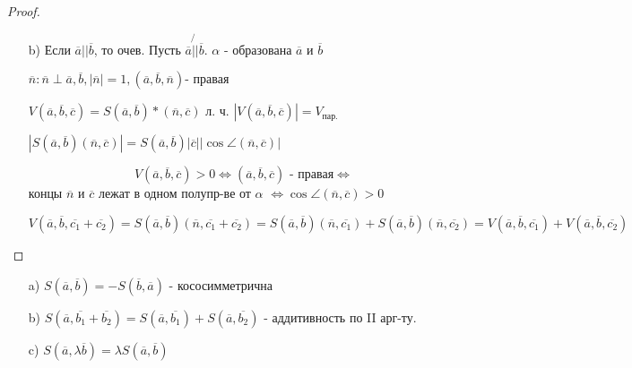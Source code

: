 \begin{proof}
\begin{itemize}
  \item [b) ] Если $\overline{a} || \overline{b}$, то очев.
    Пусть $\overline{a} \not{||} \overline{b}$. $\alpha$ - образована $\overline{a}$ и $\overline{b}$

    $\overline{n}\colon \overline{n} \perp \overline{a}, \overline{b}, |\overline{n}| = 1, (\overline{a}, \overline{b}, \overline{n}) \text{- правая}$

    \begin{lemma}
    $V(\overline{a}, \overline{b}, \overline{c}) = S(\overline{a}, \overline{b}) * (\overline{n}, \overline{c})$
    л. ч. $|V(\overline{a}, \overline{b}, \overline{c})| = V_{\text{пар.}}$

    $|S(\overline{a}, \overline{b}) (\overline{n}, \overline{c})| = S(\overline{a}, \overline{b}) |\overline{c}| |\cos \angle (\overline{n}, \overline{c})|$

    \[
    V(\overline{a}, \overline{b}, \overline{c}) > 0 \iff (\overline{a}, \overline{b}, \overline{c}) \text{ - правая} \iff 
    \] 
    концы $\overline{n}$ и $\overline{c}$ лежат в одном полупр-ве от $\alpha$ $\iff \cos \angle (\overline{n}, \overline{c}) > 0$
    \end{lemma}

    \[
    V(\overline{a}, \overline{b}, \overline{c_1} + \overline{c_2}) = S(\overline{a}, \overline{b}) (\overline{n}, \overline{c_1} + \overline{c_2}) = S(\overline{a}, \overline{b})(\overline{n}, \overline{c_1}) + S(\overline{a}, \overline{b})(\overline{n}, \overline{c_2}) = V(\overline{a}, \overline{b}, \overline{c_1}) + V(\overline{a}, \overline{b}, \overline{c_2})
    \]  
\end{itemize}
\end{proof}
\begin{theorem}
\begin{itemize}
  \item [a) ] $S(\overline{a}, \overline{b}) = -S(\overline{b}, \overline{a})$ - кососимметрична
  \item [b) ] $S(\overline{a}, \overline{b_1} + \overline{b_2}) = S(\overline{a}, \overline{b_1}) + S(\overline{a}, \overline{b_2})$ - аддитивность по II арг-ту.
  \item [c) ] $S(\overline{a}, \lambda \overline{b}) = \lambda S(\overline{a}, \overline{b})$
\end{itemize}
\end{theorem}
